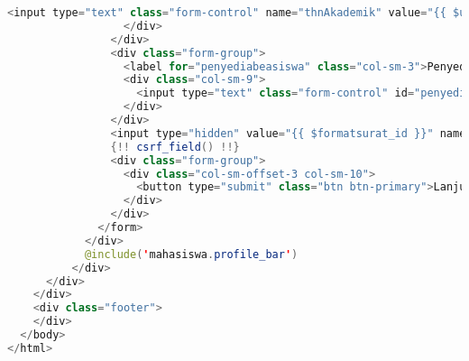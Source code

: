 \begin{lstlisting}[language=Java,basicstyle=\tiny,caption=Pengisian data keterangan beasiswa.blade.php]
                    <input type="text" class="form-control" name="thnAkademik" value="{{ $user->thnAkademik }}" readonly style="border: none" />
                  </div>
                </div>
                <div class="form-group">
                  <label for="penyediabeasiswa" class="col-sm-3">Penyedia beasiswa</label>
                  <div class="col-sm-9">
                    <input type="text" class="form-control" id="penyediabeasiswa" required name="penyediabeasiswa" >
                  </div>
                </div>
                <input type="hidden" value="{{ $formatsurat_id }}" name="jenis_surat">
                {!! csrf_field() !!}
                <div class="form-group">
                  <div class="col-sm-offset-3 col-sm-10">
                    <button type="submit" class="btn btn-primary">Lanjutkan</button>
                  </div>
                </div>
              </form>
            </div>
            @include('mahasiswa.profile_bar')
          </div>
      </div>
    </div>
    <div class="footer">
    </div>
  </body>
</html>

\end{lstlisting}

